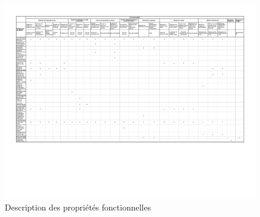 \begin{landscape}
  \begin{figure}[h]
    \label{annexe_dpf}
    \centering
    \includegraphics[scale=0.8]{resources/dpf.pdf}
    \caption{Description des propriétés fonctionnelles}
  \end{figure}
\end{landscape}